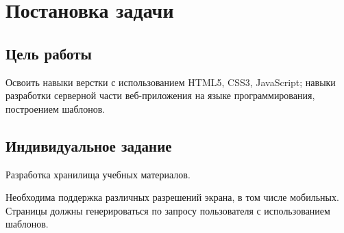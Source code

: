 \chapter{Постановка задачи}
\section{Цель работы}

Освоить навыки верстки с использованием HTML5, CSS3, JavaScript; навыки разработки серверной части веб-приложения на языке программирования, построением шаблонов.

\section{Индивидуальное  задание}

Разработка хранилища учебных материалов.

Необходима поддержка различных разрешений экрана, в том числе мобильных. Страницы должны генерироваться по запросу пользователя с использованием шаблонов.